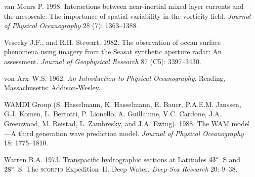 \begin{thebibliography}{999}
van Meurs P. 1998. Interactions between near-inertial mixed layer
currents and the meso\-scale: The importance of spatial variability in
the vorticity field. \textit{Journal of Physical Oceanography} 28 (7):
1363--1388.
%

Vesecky J.F., and R.H. Stewart.  1982. The observation of ocean
surface phenomena using imagery from the Seasat synthetic aperture
radar: An assessment.  \textit{Journal of Geophysical Research} 87
(C5): 3397--3430.
%

von Arx~W.S. 1962. \textit{An Introduction to Physical
  Oceanography}. Reading, Massachusetts: Addison-Wesley.
%

WAMDI Group (S. Hasselmann, K. Hasselmann, E. Bauer,
P.A.E.M. Jans\-sen, G.J. Komen, L. Bertotti, P. Lionello,
A. Guillaume, V.C. Cardone, J.A. Greenwood, M. Reistad, L. Zambresky,
and J.A. Ewing). 1988. The WAM model---A third generation wave
prediction model. \textit{Journal of Physical Oceanography} 18:
1775--1810.
%

Warren B.A.  1973. Transpacific hydrographic sections at Latitudes
${43}^\circ$~S and~${28}^\circ$~S: The \textsc{scorpio}
Expedition--II. Deep Water. \textit{Deep-Sea Research} 20: 9--38.
%


\end{thebibliography}
